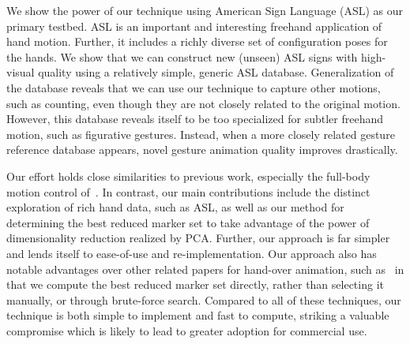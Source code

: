 We show the power of our technique using American Sign Language (ASL) as our primary testbed. ASL
is an important and interesting freehand application of hand motion.  Further, it includes a richly diverse
set of configuration poses for the hands.   We show that we can construct new (unseen) ASL signs with 
high-visual quality using a relatively simple, generic ASL database.  Generalization of the database
reveals that we can use our technique to capture other motions, such as counting, even though they
are not closely related to the original motion.  However, this database reveals itself to be too specialized
for subtler freehand motion, such as figurative gestures.  Instead, when a more closely related
gesture reference database appears, novel gesture animation quality improves drastically.   

Our effort holds close similarities to previous work, especially the full-body motion control
of~\cite{Chai05}.  In contrast, our main contributions include the distinct exploration of rich hand
data, such as ASL, as well as our method for determining the best reduced marker set to take
advantage of the power of dimensionality
reduction realized by PCA.  Further, our approach is far simpler and lends itself to ease-of-use and
re-implementation.
Our approach also has notable advantages over other related papers for hand-over animation,
such as~\cite{HoyRyaOSu11,KanWheZor12} in that we compute the best reduced marker set directly,
rather than selecting it manually, or through brute-force search.
Compared to all of these techniques, our technique is both simple to implement and fast to compute,
striking a valuable compromise which is likely to lead to greater adoption for commercial use.

